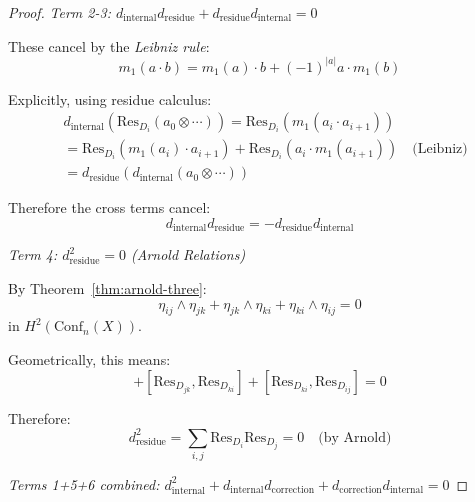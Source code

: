 \begin{proof}
\emph{Term 2-3: $d_{\text{internal}} d_{\text{residue}} + d_{\text{residue}} d_{\text{internal}} = 0$}

These cancel by the \emph{Leibniz rule}:
\begin{equation}
m_1(a \cdot b) = m_1(a) \cdot b + (-1)^{|a|} a \cdot m_1(b)
\end{equation}

Explicitly, using residue calculus:
\begin{align}
&d_{\text{internal}}(\text{Res}_{D_i}(a_0 \otimes \cdots)) 
= \text{Res}_{D_i}(m_1(a_i \cdot a_{i+1})) \\
&= \text{Res}_{D_i}(m_1(a_i) \cdot a_{i+1}) + \text{Res}_{D_i}(a_i \cdot m_1(a_{i+1})) 
\quad \text{(Leibniz)} \\
&= d_{\text{residue}}(d_{\text{internal}}(a_0 \otimes \cdots))
\end{align}

Therefore the cross terms cancel: 
\[d_{\text{internal}} d_{\text{residue}} = - d_{\text{residue}} d_{\text{internal}}\]

\emph{Term 4: $d_{\text{residue}}^2 = 0$ (Arnold Relations)}

By Theorem~\ref{thm:arnold-three}:
\begin{equation}
\eta_{ij} \wedge \eta_{jk} + \eta_{jk} \wedge \eta_{ki} + \eta_{ki} \wedge \eta_{ij} = 0
\end{equation}
in $H^2(\text{Conf}_n(X))$.

Geometrically, this means:
\begin{equation}
[\text{Res}_{D_{ij}}, \text{Res}_{D_{jk}}] + [\text{Res}_{D_{jk}}, \text{Res}_{D_{ki}}] 
+ [\text{Res}_{D_{ki}}, \text{Res}_{D_{ij}}] = 0
\end{equation}

Therefore:
\[d_{\text{residue}}^2 = \sum_{i,j} \text{Res}_{D_i} \text{Res}_{D_j} 
= 0 \quad \text{(by Arnold)}\]

\emph{Terms 1+5+6 combined: $d_{\text{internal}}^2 + d_{\text{internal}} d_{\text{correction}} + d_{\text{correction}} d_{\text{internal}} = 0$}


\end{proof}
